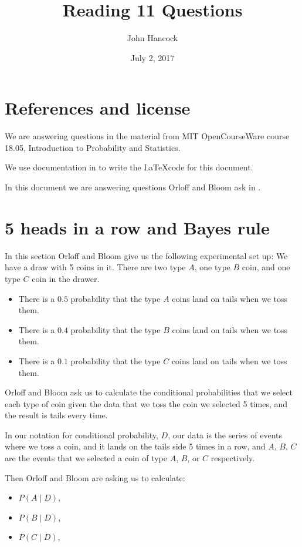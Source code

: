 \documentclass{article}
\title{Reading 11 Questions}
\author{John Hancock}
\date{July 2, 2017}
\begin{document}
\maketitle \tableofcontents
\section{References and license}
We are answering questions in the material from MIT OpenCourseWare
course 18.05, Introduction to Probability and Statistics.

We use documentation in \cite{fancyH} to write the \LaTeX code for
this document.

In this document we are answering questions Orloff and Bloom ask in
\cite{reading11qu}.

\section{5 heads in a row and Bayes rule}
In this section Orloff and Bloom give us the following experimental set up:
We have a draw with 5 coins in it.  There are two type $A$, one type $B$ coin, 
and one type $C$ coin in the drawer.

\begin{itemize}
\item There is a $0.5$ probability that the type $A$ coins land on tails 
  when we toss them.
\item There is a $0.4$ probability that the type $B$ coins land on tails 
  when we toss them.
\item There is a $0.1$ probability that the type $C$ coins land on tails 
  when we toss them.
\end{itemize}

Orloff and Bloom ask us to calculate the conditional probabilities
that we select each type of coin given the data that we toss the
coin we selected 5 times, and the result is tails every time.

In our notation for conditional probability, $D$, our data is the
series of events where we toss a coin, and it lands on the tails side
5 times in a row, and $A$, $B$, $C$ are the events that we selected
a coin of type $A$, $B$, or $C$ respectively.

Then Orloff and Bloom are asking us to calculate:

\begin{itemize}
\item $P\left(A \mid D \right)$,
\item $P\left(B \mid D \right)$,
\item $P\left(C \mid D \right)$,
\end{itemize}
\end{document}
